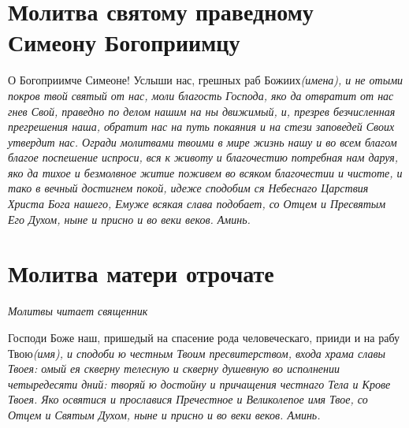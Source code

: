 \section{Молитва святому праведному Симеону Богоприимцу}\begin{mymulticols}



О Богоприимче Симеоне! Услыши нас, грешных раб Божиих\itshape  (имена),\normalfont{} и не отыми покров твой святый от нас, моли благость Господа, яко да отвратит от нас гнев Свой, праведно по делом нашим на ны движимый, и, презрев безчисленная прегрешения наша, обратит нас на путь покаяния и на стези заповедей Своих утвердит нас. Огради молитвами твоими в мире жизнь нашу и во всем благом благое поспешение испроси, вся к животу и благочестию потребная нам даруя, яко да тихое и безмолвное житие поживем во всяком благочестии и чистоте, и тако в вечный достигнем покой, идеже сподобим ся Небеснаго Царствия Христа Бога нашего, Емуже всякая слава подобает, со Отцем и Пресвятым Его Духом, ныне и присно и во веки веков. Аминь.


\end{mymulticols}

\section{Молитва матери отрочате}\begin{mymulticols}



\itshape Молитвы читает священник\normalfont{}

Господи Боже наш, пришедый на спасение рода человеческаго, прииди и на рабу Твою\itshape  (имя)\normalfont{}, и сподоби ю честным Твоим пресвитерством, входа храма славы Твоея: омый ея скверну телесную и скверну душевную во исполнении четыредесяти дний: творяй ю достойну и причащения честнаго Тела и Крове Твоея. Яко освятися и прославися Пречестное и Великолепое имя Твое, со Отцем и Святым Духом, ныне и присно и во веки веков. Аминь.





\end{mymulticols}

